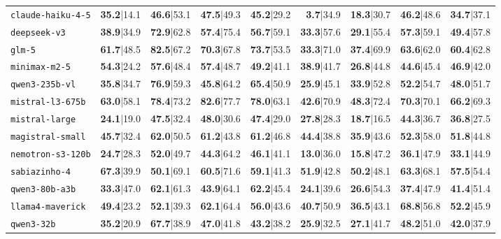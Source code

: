 \documentclass{IOS-Book-Article}
\begin{document}
\begin{table}[!ht]
\begin{tabular}{llrrrrrrr}
\texttt{claude-haiku-4-5} & \textbf{35.2}|14.1 & \textbf{46.6}|53.1 & \textbf{47.5}|49.3 & \textbf{45.2}|29.2 & \textbf{3.7}|34.9 & \textbf{18.3}|30.7 & \textbf{46.2}|48.6 & \textbf{34.7}|37.1 \\
\texttt{deepseek-v3} & \textbf{38.9}|34.9 & \textbf{72.9}|62.8 & \textbf{57.4}|75.4 & \textbf{56.7}|59.1 & \textbf{33.3}|57.6 & \textbf{29.1}|55.4 & \textbf{57.3}|59.1 & \textbf{49.4}|57.8 \\
\texttt{glm-5} & \textbf{61.7}|48.5 & \textbf{82.5}|67.2 & \textbf{70.3}|67.8 & \textbf{73.7}|53.5 & \textbf{33.3}|71.0 & \textbf{37.4}|69.9 & \textbf{63.6}|62.0 & \textbf{60.4}|62.8 \\
\texttt{minimax-m2-5} & \textbf{54.3}|24.2 & \textbf{57.6}|48.4 & \textbf{57.4}|48.7 & \textbf{49.2}|41.1 & \textbf{38.9}|41.7 & \textbf{26.8}|44.8 & \textbf{44.6}|45.4 & \textbf{46.9}|42.0 \\
\texttt{qwen3-235b-vl} & \textbf{35.8}|34.7 & \textbf{76.9}|59.3 & \textbf{45.8}|64.2 & \textbf{65.4}|50.9 & \textbf{25.9}|45.1 & \textbf{33.9}|52.8 & \textbf{52.2}|54.7 & \textbf{48.0}|51.7 \\
\texttt{mistral-l3-675b} & \textbf{63.0}|58.1 & \textbf{78.4}|73.2 & \textbf{82.6}|77.7 & \textbf{78.0}|63.1 & \textbf{42.6}|70.9 & \textbf{48.3}|72.4 & \textbf{70.3}|70.1 & \textbf{66.2}|69.3 \\
\texttt{mistral-large} & \textbf{24.1}|19.0 & \textbf{47.5}|32.4 & \textbf{48.0}|30.6 & \textbf{47.4}|29.0 & \textbf{27.8}|28.3 & \textbf{18.7}|16.5 & \textbf{44.3}|36.7 & \textbf{36.8}|27.5 \\
\texttt{magistral-small} & \textbf{45.7}|32.4 & \textbf{62.0}|50.5 & \textbf{61.2}|43.8 & \textbf{61.2}|46.8 & \textbf{44.4}|38.8 & \textbf{35.9}|43.6 & \textbf{52.3}|58.0 & \textbf{51.8}|44.8 \\
\texttt{nemotron-s3-120b} & \textbf{24.7}|28.3 & \textbf{52.0}|49.7 & \textbf{44.3}|64.2 & \textbf{46.1}|41.1 & \textbf{13.0}|36.0 & \textbf{15.8}|47.2 & \textbf{36.1}|47.9 & \textbf{33.1}|44.9 \\
\texttt{sabiazinho-4} & \textbf{67.3}|39.9 & \textbf{50.1}|69.1 & \textbf{60.5}|71.6 & \textbf{59.1}|41.3 & \textbf{51.9}|42.8 & \textbf{50.2}|48.1 & \textbf{63.3}|68.1 & \textbf{57.5}|54.4 \\
\texttt{qwen3-80b-a3b} & \textbf{33.3}|47.0 & \textbf{62.1}|61.3 & \textbf{43.9}|64.1 & \textbf{62.2}|45.4 & \textbf{24.1}|39.6 & \textbf{26.6}|54.3 & \textbf{37.4}|47.9 & \textbf{41.4}|51.4 \\
\texttt{llama4-maverick} & \textbf{49.4}|23.2 & \textbf{52.1}|39.3 & \textbf{62.1}|64.4 & \textbf{56.0}|43.6 & \textbf{40.7}|50.9 & \textbf{36.5}|43.1 & \textbf{68.8}|56.8 & \textbf{52.2}|45.9 \\
\texttt{qwen3-32b} & \textbf{35.2}|20.9 & \textbf{67.7}|38.9 & \textbf{47.0}|41.8 & \textbf{43.2}|38.2 & \textbf{25.9}|32.5 & \textbf{27.1}|41.7 & \textbf{48.2}|51.0 & \textbf{42.0}|37.9 \\
\hline
\end{tabular}
\end{table}
\end{document}
